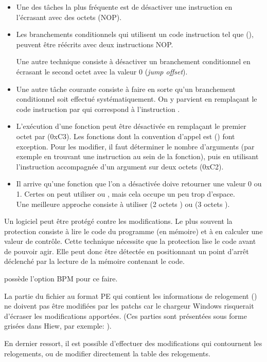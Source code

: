 \begin{itemize}

\item Une des tâches la plus fréquente est de désactiver une instruction en l'écrasant
avec des octets  (\ac{NOP}).

\item Les branchements conditionnels qui utilisent un code instruction tel que  (\JZ),
peuvent être réécrits avec deux instructions \ac{NOP}.

Une autre technique consiste à désactiver un branchement conditionnel en écrasant le second octet
avec la valeur 0 (\emph{jump offset}).

\item
Une autre tâche courante consiste à faire en sorte qu'un branchement conditionnel soit effectué
systématiquement. On y parvient en remplaçant le code instruction par  qui correspond à
l'instruction \JMP.

\item L'exécution d'une fonction peut être désactivée en remplaçant le premier octet par \RETN (0xC3).
Les fonctions dont la convention d'appel est  () font exception.
Pour les modifier, il faut déterminer le nombre d'arguments (par exemple en trouvant une instruction
\RETN au sein de la fonction), puis en utilisant l'instruction \RETN accompagnée d'un argument sur
deux octets (0xC2).

\item Il arrive qu'une fonction que l'on a désactivée doive retourner une valeur 0 ou 1. Certes on
peut utiliser  ou , mais cela occupe un peu trop d'espace.\\
Une meilleure approche consiste à utiliser  (2 octets ) ou
 (3 octets ).

\end{itemize}

Un logiciel peut être protégé contre les modifications. Le plus souvent la protection consiste à
lire le code du programme (en mémoire) et à en calculer une valeur de contrôle.
Cette technique nécessite que la protection lise le code avant de pouvoir agir. Elle peut donc être
détectée en positionnant un point d'arrêt déclenché par la lecture de la mémoire contenant le code.

\tracer possède l'option BPM pour ce faire.

La partie du fichier au format PE qui contient les informations de relogement ()
ne doivent pas être modifiées par les patchs car le chargeur Windows risquerait d'écraser les
modifications apportées.
(Ces parties sont présentées sous forme grisées dans Hiew, par exemple:
).

En dernier ressort, il est possible d'effectuer des modifications qui contournent les relogements,
ou de modifier directement la table des relogements.
